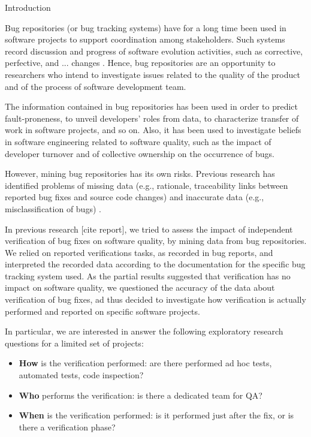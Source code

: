 \begin{section}{Introduction}

Bug repositories (or bug tracking systems) have for a long time been used in software projects to support coordination among stakeholders. Such systems record discussion and progress of software evolution activities, such as corrective, perfective, and ... changes \cite{Antoniol2008}. Hence, bug repositories are an opportunity to researchers who intend to investigate issues related to the quality of the product and of the process of software development team.

The information contained in bug repositories has been used in order to predict fault-proneness, to unveil developers' roles from data, to characterize transfer of work in software projects, and so on. Also, it has been used to investigate beliefs in software engineering related to software quality, such as the impact of developer turnover and of collective ownership on the occurrence of bugs.

However, mining bug repositories has its own risks. Previous research has identified problems of missing data (e.g., rationale, traceability links between reported bug fixes and source code changes) and inaccurate data (e.g., misclassification of bugs) \cite{Aranda2009,Bird2009,Nguyen2010,Ayari2007}.

  In previous research [cite report], we tried to assess the impact of independent verification of bug fixes on software quality, by mining data from bug repositories. 
  We relied on reported verifications tasks, as recorded in bug reports, and interpreted the recorded data according to the documentation for the specific bug tracking system used.
  As the partial results suggested that verification has no impact on software quality, we questioned the accuracy of the data about verification of bug fixes, ad thus decided to investigate how verification is actually performed and reported on specific software projects.
	
	In particular, we are interested in answer the following exploratory research questions for a limited set of projects:

	\begin{itemize}
		\item \textbf{How} is the verification performed: are there performed ad hoc tests, automated tests, code inspection?
		\item \textbf{Who} performs the verification: is there a dedicated team for QA? 
		\item \textbf{When} is the verification performed: is it performed just after the fix, or is there a verification phase?
	\end{itemize}


\end{section}
